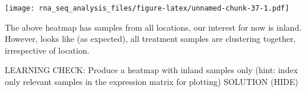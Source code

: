 \documentclass[
]{article}
\newenvironment{Shaded}{\begin{snugshade}}{\end{snugshade}}
\newcommand{\CommentTok}[1]{\textcolor[rgb]{0.56,0.35,0.01}{\textit{#1}}}
\newcommand{\DataTypeTok}[1]{\textcolor[rgb]{0.13,0.29,0.53}{#1}}
\newcommand{\DecValTok}[1]{\textcolor[rgb]{0.00,0.00,0.81}{#1}}
\newcommand{\KeywordTok}[1]{\textcolor[rgb]{0.13,0.29,0.53}{\textbf{#1}}}
\newcommand{\NormalTok}[1]{#1}
\newcommand{\OperatorTok}[1]{\textcolor[rgb]{0.81,0.36,0.00}{\textbf{#1}}}
\newcommand{\StringTok}[1]{\textcolor[rgb]{0.31,0.60,0.02}{#1}}
\begin{document}
\begin{Shaded}
\end{Shaded}

\texttt{[image: rna\_seq\_analysis\_files/figure-latex/unnamed-chunk-37-1.pdf]}

The above heatmap has samples from all locations, our interest for now
is inland. However, looks like (as expected), all treatment samples are
clustering together, irrespective of location.

LEARNING CHECK: Produce a heatmap with inland samples only (hint: index
only relevant samples in the expression matrix for plotting) SOLUTION
(HIDE)
\end{document}

